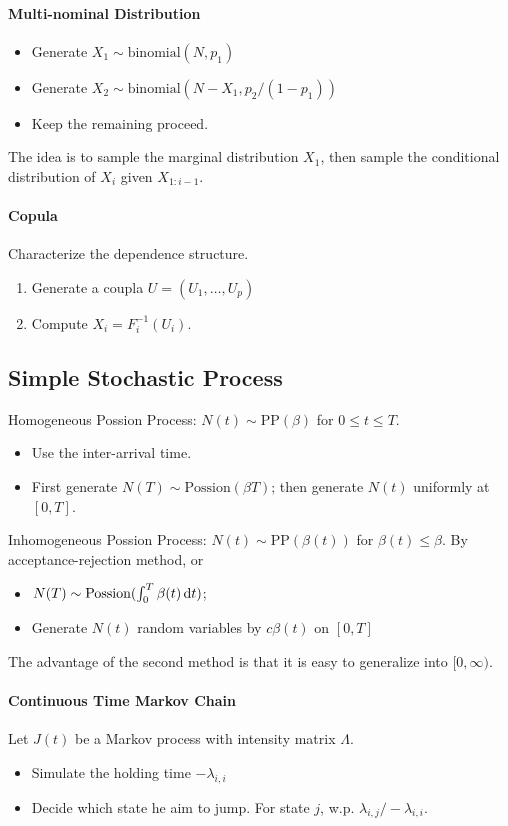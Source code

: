 \paragraph{Multi-nominal Distribution}
\begin{itemize}
\item
Generate $X_1\sim\mbox{binomial}(N,p_1)$
\item
Generate $X_2\sim\mbox{binomial}(N-X_1,p_2/(1-p_1))$
\item
Keep the remaining proceed.
\end{itemize}

The idea is to sample the marginal distribution $X_1$, then sample the conditional distribution of $X_i$ given $X_{1:i-1}$.

\paragraph{Copula}
Characterize the dependence structure.
\begin{enumerate}
\item
Generate a coupla $U=(U_1,\ldots,U_p)$
\item
Compute $X_i = F_i^{-1}(U_i)$.
\end{enumerate}

\subsection{Simple Stochastic Process}

Homogeneous Possion Process:
$N(t)\sim\text{PP}(\beta)$ for $0\le t\le T$.
\begin{itemize}
\item
Use the inter-arrival time.
\item
First generate $N(T)\sim\text{Possion}(\beta T)$; then generate $N(t)$ uniformly at $[0,T]$.
\end{itemize}


Inhomogeneous Possion Process:
$N(t)\sim\text{PP}(\beta(t))$ for $\beta(t)\le\beta$.
By acceptance-rejection method, or
\begin{itemize}
\item
$N(T)\sim\text{Possion}(\int_0^T\beta(t)\,\mathrm{d} t)$;
\item
Generate $N(t)$ random variables by $c\beta(t)$ on $[0,T]$
\end{itemize}
The advantage of the second method is that it is easy to generalize into $[0,\infty)$.


\paragraph{Continuous Time Markov Chain}
Let $J(t)$ be a Markov process with intensity matrix $\Lambda$.
\begin{itemize}
\item
Simulate the holding time $-\lambda_{i,i}$
\item
Decide which state he aim to jump. For state $j$, w.p. $\lambda_{i,j}/-\lambda_{i,i}$.
\end{itemize}


